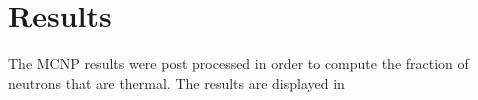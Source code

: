 \section{Results}

The MCNP results were post processed in order to compute the fraction of neutrons that are thermal.
The results are displayed in  
\begin{figure*}[!ht]
	\centering
	\begin{subfigure}[b]{0.45\textwidth,}
		\centering
    \missingfigure
	\end{subfigure}%
	~
	\begin{subfigure}[b]{0.45\textwidth}
		\centering
    \missingfigure
	\end{subfigure}%
\end{figure*}
%

